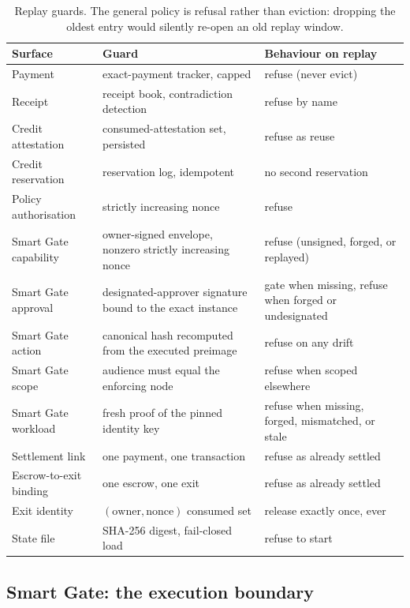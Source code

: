 \documentclass{article}
\begin{document}
\begin{table}[htbp]
\centering
\begin{tabular}{lll}
\toprule
\textbf{Surface} & \textbf{Guard} & \textbf{Behaviour on replay} \\
\midrule
Payment & exact-payment tracker, capped & refuse (never evict) \\
Receipt & receipt book, contradiction detection & refuse by name \\
Credit attestation & consumed-attestation set, persisted & refuse as reuse \\
Credit reservation & reservation log, idempotent & no second reservation \\
Policy authorisation & strictly increasing nonce & refuse \\
Smart Gate capability & owner-signed envelope, nonzero strictly increasing nonce & refuse (unsigned, forged, or replayed) \\
Smart Gate approval & designated-approver signature bound to the exact instance & gate when missing, refuse when forged or undesignated \\
Smart Gate action & canonical hash recomputed from the executed preimage & refuse on any drift \\
Smart Gate scope & audience must equal the enforcing node & refuse when scoped elsewhere \\
Smart Gate workload & fresh proof of the pinned identity key & refuse when missing, forged, mismatched, or stale \\
Settlement link & one payment, one transaction & refuse as already settled \\
Escrow-to-exit binding & one escrow, one exit & refuse as already settled \\
Exit identity & $(\text{owner},\text{nonce})$ consumed set & release exactly
  once, ever \\
State file & SHA-256 digest, fail-closed load & refuse to start \\
\bottomrule
\end{tabular}
\caption{Replay guards. The general policy is refusal rather than eviction:
dropping the oldest entry would silently re-open an old replay window.}
\label{tab:replay}
\end{table}

\subsection{Smart Gate: the execution boundary}
\label{sec:smartgate}
\end{document}
